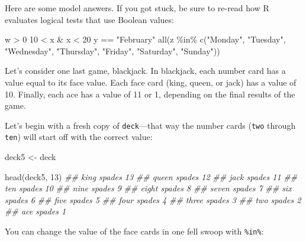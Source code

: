 \documentclass[
  letterpaper,
  DIV=11,
  numbers=noendperiod]{scrbook}
\newenvironment{Shaded}{\begin{snugshade}}{\end{snugshade}}
\newcommand{\DecValTok}[1]{\textcolor[rgb]{0.68,0.00,0.00}{#1}}
\newcommand{\DocumentationTok}[1]{\textcolor[rgb]{0.37,0.37,0.37}{\textit{#1}}}
\newcommand{\FunctionTok}[1]{\textcolor[rgb]{0.28,0.35,0.67}{#1}}
\newcommand{\NormalTok}[1]{\textcolor[rgb]{0.00,0.23,0.31}{#1}}
\newcommand{\OtherTok}[1]{\textcolor[rgb]{0.00,0.23,0.31}{#1}}
\newcommand{\SpecialCharTok}[1]{\textcolor[rgb]{0.37,0.37,0.37}{#1}}
\newcommand{\StringTok}[1]{\textcolor[rgb]{0.13,0.47,0.30}{#1}}
\begin{document}
Here are some model answers. If you got stuck, be sure to re-read how R
evaluates logical tests that use Boolean values:

\begin{Shaded}
\begin{Highlighting}[]
\NormalTok{w }\SpecialCharTok{\textgreater{}} \DecValTok{0}
\DecValTok{10} \SpecialCharTok{\textless{}}\NormalTok{ x }\SpecialCharTok{\&}\NormalTok{ x }\SpecialCharTok{\textless{}} \DecValTok{20}
\NormalTok{y }\SpecialCharTok{==} \StringTok{"February"}
\FunctionTok{all}\NormalTok{(z }\SpecialCharTok{\%in\%} \FunctionTok{c}\NormalTok{(}\StringTok{"Monday"}\NormalTok{, }\StringTok{"Tuesday"}\NormalTok{, }\StringTok{"Wednesday"}\NormalTok{, }\StringTok{"Thursday"}\NormalTok{, }\StringTok{"Friday"}\NormalTok{, }
  \StringTok{"Saturday"}\NormalTok{, }\StringTok{"Sunday"}\NormalTok{))}
\end{Highlighting}
\end{Shaded}

Let's consider one last game, blackjack. In blackjack, each number card
has a value equal to its face value. Each face card (king, queen, or
jack) has a value of 10. Finally, each ace has a value of 11 or 1,
depending on the final results of the game.

Let's begin with a fresh copy of \texttt{deck}---that way the number
cards (\texttt{two} through \texttt{ten}) will start off with the
correct value:

\begin{Shaded}
\begin{Highlighting}[]
\NormalTok{deck5 }\OtherTok{\textless{}{-}}\NormalTok{ deck}

\FunctionTok{head}\NormalTok{(deck5, }\DecValTok{13}\NormalTok{)}
\DocumentationTok{\#\#   king spades    13}
\DocumentationTok{\#\#  queen spades    12}
\DocumentationTok{\#\#   jack spades    11}
\DocumentationTok{\#\#    ten spades    10}
\DocumentationTok{\#\#   nine spades     9}
\DocumentationTok{\#\#  eight spades     8}
\DocumentationTok{\#\#  seven spades     7}
\DocumentationTok{\#\#    six spades     6}
\DocumentationTok{\#\#   five spades     5}
\DocumentationTok{\#\#   four spades     4}
\DocumentationTok{\#\#  three spades     3}
\DocumentationTok{\#\#    two spades     2}
\DocumentationTok{\#\#    ace spades     1}
\end{Highlighting}
\end{Shaded}

You can change the value of the face cards in one fell swoop with
\texttt{\%in\%}:
\end{document}
